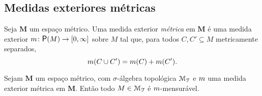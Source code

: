\subsection{Medidas exteriores métricas}

\begin{definition}
Seja $\bm M$ um espaço métrico. Uma medida exterior \emph{métrica} em $\bm M$ é uma medida exterior $\med\colon \p(M) \to \intff{0}{\infty}$ sobre $M$ tal que, para todos $C,C' \subseteq M$ metricamente separados,
	\begin{equation*}
	m(C \cup C') = m(C) + m(C').
	\end{equation*}
\end{definition}

\begin{proposition}
\label{prop:criterio.mensur.med.metrica}
Sejam $\bm M$ um espaço métrico, com $\sigma$-álgebra topológica $\mathcal{M}_{\mathcal{T}}$ e $m$ uma medida exterior métrica em $\bm M$. Então todo $M \in \mathcal{M}_{\mathcal{T}}$ é $m$-mensurável.
\end{proposition}
